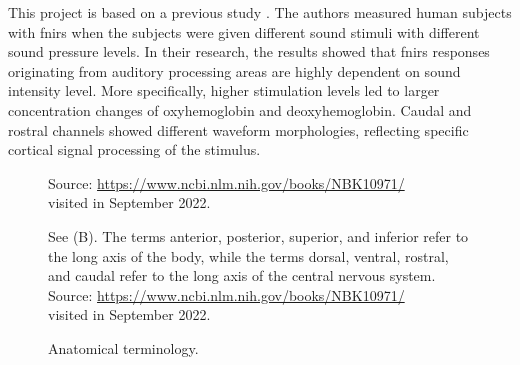 This project is based on a previous study \citep{Weder2018}. The authors measured human subjects with  \acrshort{fnirs} when the subjects were given different sound stimuli with different sound pressure levels. In their research, the results showed that  \acrshort{fnirs} responses originating from auditory processing areas are highly dependent on sound intensity level. More specifically, higher stimulation levels led to larger concentration changes of oxyhemoglobin and deoxyhemoglobin. Caudal and rostral channels showed different waveform morphologies, reflecting specific cortical signal processing of the stimulus. 

\begin{figure}[h]
  \centering
           {Source: \url{https://www.ncbi.nlm.nih.gov/books/NBK10971/} \\ visited in September 2022.}
   
  \caption{Anatomical terminology.}
  
  \medskip
  \footnotesize {See (B). The terms anterior, posterior, superior, and inferior refer to the long axis of the body, while the terms dorsal, ventral, rostral, and caudal refer to the long axis of the central nervous system. Source: \url{https://www.ncbi.nlm.nih.gov/books/NBK10971/}\\ visited in September 2022.}
\end{figure}




